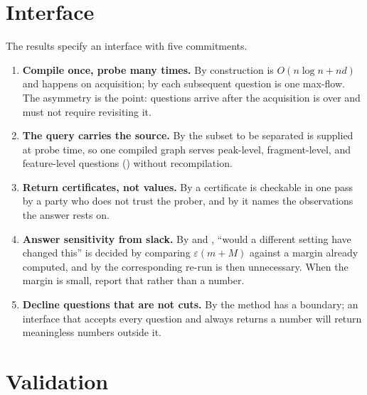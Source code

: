 \documentclass[11pt,a4paper]{article}
\theoremstyle{definition}
\theoremstyle{remark}
\begin{document}
\section{Interface}
\label{sec:practice}

The results specify an interface with five commitments.

\begin{enumerate}[label=(\roman*)]
\item \textbf{Compile once, probe many times.} By
 construction is $O(n\log n + nd)$ and happens on
acquisition; by  each subsequent question is one
max-flow. The asymmetry is the point: questions arrive after the
acquisition is over and must not require revisiting it.

\item \textbf{The query carries the source.} By  the
subset to be separated is supplied at probe time, so one compiled graph
serves peak-level, fragment-level, and feature-level questions
() without recompilation.

\item \textbf{Return certificates, not values.} By
 a certificate is checkable in one pass by a party who
does not trust the prober, and by  it names the
observations the answer rests on.

\item \textbf{Answer sensitivity from slack.} By
 and , ``would a different setting
have changed this'' is decided by comparing $\varepsilon(m+M)$ against a
margin already computed, and by  the corresponding
re-run is then unnecessary. When the margin is small, report that rather
than a number.

\item \textbf{Decline questions that are not cuts.} By
 the method has a boundary; an interface that accepts
every question and always returns a number will return meaningless
numbers outside it.
\end{enumerate}

\section{Validation}
\label{sec:validation}
\end{document}
